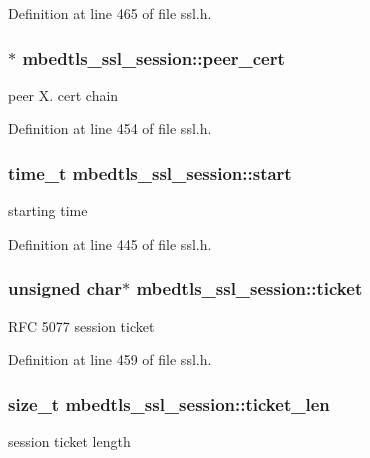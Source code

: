 Definition at line 465 of file ssl.\-h.

\hypertarget{structmbedtls__ssl__session_a2133d1643e524378f074bd9da89aca42}{
\subsubsection[{peer\-\_\-cert}]{$\ast$ mbedtls\-\_\-ssl\-\_\-session\-::peer\-\_\-cert}}\label{structmbedtls__ssl__session_a2133d1643e524378f074bd9da89aca42}
peer X. cert chain 

Definition at line 454 of file ssl.\-h.

\hypertarget{structmbedtls__ssl__session_a191c291c985d4637ad2ed5dce190a4fd}{
\subsubsection[{start}]{\setlength{\rightskip}{0pt plus 5cm}time\-\_\-t mbedtls\-\_\-ssl\-\_\-session\-::start}}\label{structmbedtls__ssl__session_a191c291c985d4637ad2ed5dce190a4fd}
starting time 

Definition at line 445 of file ssl.\-h.

\hypertarget{structmbedtls__ssl__session_ad639f04ea53fe3602f1188967187436f}{
\subsubsection[{ticket}]{\setlength{\rightskip}{0pt plus 5cm}unsigned char$\ast$ mbedtls\-\_\-ssl\-\_\-session\-::ticket}}\label{structmbedtls__ssl__session_ad639f04ea53fe3602f1188967187436f}
R\-F\-C 5077 session ticket 

Definition at line 459 of file ssl.\-h.

\hypertarget{structmbedtls__ssl__session_a381594bf55513430e6c61bf287baf38b}{
\subsubsection[{ticket\-\_\-len}]{\setlength{\rightskip}{0pt plus 5cm}size\-\_\-t mbedtls\-\_\-ssl\-\_\-session\-::ticket\-\_\-len}}\label{structmbedtls__ssl__session_a381594bf55513430e6c61bf287baf38b}
session ticket length 

